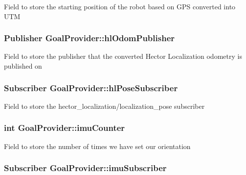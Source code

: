 \-Field to store the starting position of the robot based on \-G\-P\-S converted into \-U\-T\-M \hypertarget{classGoalProvider_a24a2ea4ae8b62c0086602471a57b74d3}{
\subsubsection[{hl\-Odom\-Publisher}]{\setlength{\rightskip}{0pt plus 5cm}\-Publisher {\bf \-Goal\-Provider\-::hl\-Odom\-Publisher}}}\label{classGoalProvider_a24a2ea4ae8b62c0086602471a57b74d3}
\-Field to store the publisher that the converted \-Hector \-Localization odometry is published on \hypertarget{classGoalProvider_a2322770657c65da748d21c844c787f5e}{
\subsubsection[{hl\-Pose\-Subscriber}]{\setlength{\rightskip}{0pt plus 5cm}\-Subscriber {\bf \-Goal\-Provider\-::hl\-Pose\-Subscriber}}}\label{classGoalProvider_a2322770657c65da748d21c844c787f5e}
\-Field to store the hector\-\_\-localization/localization\-\_\-pose subscriber \hypertarget{classGoalProvider_a1429bea432a6411c063cd3cf4990f1ca}{
\subsubsection[{imu\-Counter}]{\setlength{\rightskip}{0pt plus 5cm}int {\bf \-Goal\-Provider\-::imu\-Counter}}}\label{classGoalProvider_a1429bea432a6411c063cd3cf4990f1ca}
\-Field to store the number of times we have set our orientation \hypertarget{classGoalProvider_a86cffa9e45e8fdb0813964ca79e4a327}{
\subsubsection[{imu\-Subscriber}]{\setlength{\rightskip}{0pt plus 5cm}\-Subscriber {\bf \-Goal\-Provider\-::imu\-Subscriber}}}\label{classGoalProvider_a86cffa9e45e8fdb0813964ca79e4a327}
